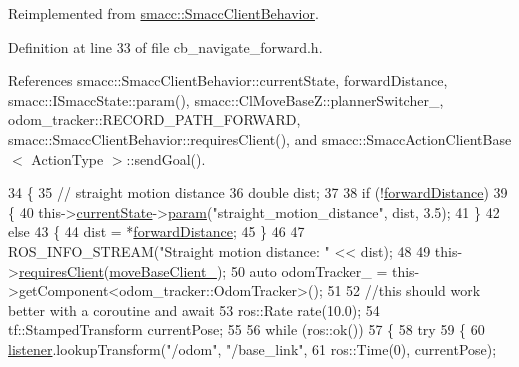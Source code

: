 Reimplemented from \hyperlink{classsmacc_1_1SmaccClientBehavior_a7962382f93987c720ad432fef55b123f}{smacc\+::\+Smacc\+Client\+Behavior}.



Definition at line 33 of file cb\+\_\+navigate\+\_\+forward.\+h.



References smacc\+::\+Smacc\+Client\+Behavior\+::current\+State, forward\+Distance, smacc\+::\+I\+Smacc\+State\+::param(), smacc\+::\+Cl\+Move\+Base\+Z\+::planner\+Switcher\+\_\+, odom\+\_\+tracker\+::\+R\+E\+C\+O\+R\+D\+\_\+\+P\+A\+T\+H\+\_\+\+F\+O\+R\+W\+A\+RD, smacc\+::\+Smacc\+Client\+Behavior\+::requires\+Client(), and smacc\+::\+Smacc\+Action\+Client\+Base$<$ Action\+Type $>$\+::send\+Goal().


\begin{DoxyCode}
34     \{
35         \textcolor{comment}{// straight motion distance}
36         \textcolor{keywordtype}{double} dist;
37 
38         \textcolor{keywordflow}{if} (!\hyperlink{classsm__dance__bot_1_1CbNavigateForward_a7aa9c05a79d2b0aa0f102ff06f579c07}{forwardDistance})
39         \{
40             this->\hyperlink{classsmacc_1_1SmaccClientBehavior_af76fc9b877542ed5caf033f820c107d0}{currentState}->\hyperlink{classsmacc_1_1ISmaccState_a4982f2187ed6da337462721146e8ef70}{param}(\textcolor{stringliteral}{"straight\_motion\_distance"}, dist, 3.5);
41         \}
42         \textcolor{keywordflow}{else}
43         \{
44             dist = *\hyperlink{classsm__dance__bot_1_1CbNavigateForward_a7aa9c05a79d2b0aa0f102ff06f579c07}{forwardDistance};
45         \}
46 
47         ROS\_INFO\_STREAM(\textcolor{stringliteral}{"Straight motion distance: "} << dist);
48 
49         this->\hyperlink{classsmacc_1_1SmaccClientBehavior_a917f001e763a1059af337bf4e164f542}{requiresClient}(\hyperlink{classsm__dance__bot_1_1CbNavigateForward_aa1cd872e92fca83c44ff0430bda061a7}{moveBaseClient\_});
50         \textcolor{keyword}{auto} odomTracker\_ = this->getComponent<odom\_tracker::OdomTracker>();
51 
52         \textcolor{comment}{//this should work better with a coroutine and await}
53         ros::Rate rate(10.0);
54         tf::StampedTransform currentPose;
55 
56         \textcolor{keywordflow}{while} (ros::ok())
57         \{
58             \textcolor{keywordflow}{try}
59             \{
60                 \hyperlink{classsm__dance__bot_1_1CbNavigateForward_a7bda457757f10a2e71eb15c07bf707b4}{listener}.lookupTransform(\textcolor{stringliteral}{"/odom"}, \textcolor{stringliteral}{"/base\_link"},
61                                          ros::Time(0), currentPose);

\end{DoxyCode}
